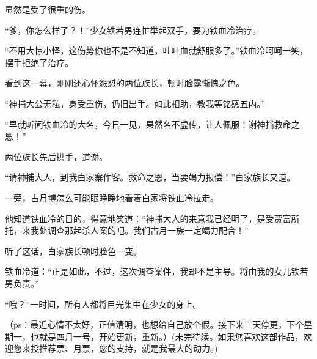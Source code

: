 \begin{this_body}
显然是受了很重的伤。

“爹，你怎么样了？！”少女铁若男连忙举起双手，要为铁血冷治疗。

“不用大惊小怪，这伤势你也不是不知道，吐吐血就舒服多了。”铁血冷呵呵一笑，摆手拒绝了治疗。

看到这一幕，刚刚还心怀怨怼的两位族长，顿时脸露惭愧之色。

“神捕大公无私，身受重伤，仍旧出手。如此相助，教我等铭感五内。”

“早就听闻铁血冷的大名，今日一见，果然名不虚传，让人佩服！谢神捕救命之恩！”

两位族长先后拱手，道谢。

“请神捕大人，到我白家寨作客。救命之恩，当要竭力报偿！”白家族长又道。

一旁，古月博怎么可能眼睁睁地看着白家将铁血冷拉走。

他知道铁血冷的目的，得意地笑道：“神捕大人的来意我已经明了，是受贾富所托，来我处调查那起杀人案的吧。我们古月一族一定竭力配合！”

听了这话，白家族长顿时脸色一变。

铁血冷道：“正是如此，不过，这次调查案件，我却不是主导。将由我的女儿铁若男负责。”

“哦？”一时间，所有人都将目光集中在少女的身上。

（ps：最近心情不太好，正值清明，也想给自己放个假。接下来三天停更，下个星期一，也就是四月一号，开始更新，重新。）(未完待续。如果您喜欢这部作品，欢迎您来投推荐票、月票，您的支持，就是我最大的动力。)

\end{this_body}

